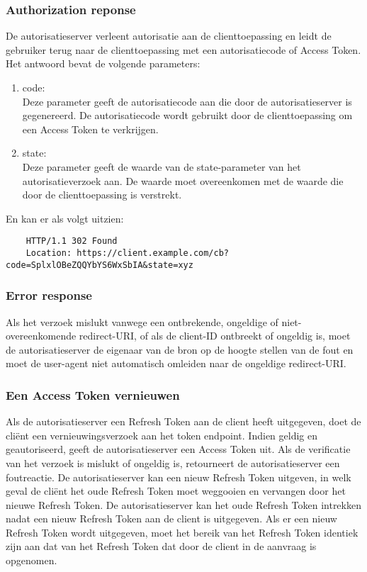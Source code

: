 \subsubsection{Authorization reponse}%
\label{subsubsec:authorization-reponse}
De autorisatieserver verleent autorisatie aan de clienttoepassing en leidt de gebruiker terug naar de clienttoepassing met een autorisatiecode of Access Token. Het antwoord bevat de volgende parameters:
\begin{enumerate}[label=\textbf{-}]
    \item code: \\
    Deze parameter geeft de autorisatiecode aan die door de autorisatieserver is gegenereerd. De autorisatiecode wordt gebruikt door de clienttoepassing om een Access Token te verkrijgen.
  
    \item state: \\
    Deze parameter geeft de waarde van de state-parameter van het autorisatieverzoek aan. De waarde moet overeenkomen met de waarde die door de clienttoepassing is verstrekt.
  \end{enumerate}
  En kan er als volgt uitzien:
  \begin{verbatim}
    HTTP/1.1 302 Found
    Location: https://client.example.com/cb?code=SplxlOBeZQQYbYS6WxSbIA&state=xyz
  \end{verbatim}

\subsubsection{Error response}%
\label{subsubsec:error-response}
Als het verzoek mislukt vanwege een ontbrekende, ongeldige of niet-overeenkomende redirect-URI, of als de client-ID ontbreekt of ongeldig is, moet de autorisatieserver de eigenaar van de bron op de hoogte stellen van de fout en moet de user-agent niet automatisch omleiden naar de ongeldige redirect-URI.

\subsubsection{Een Access Token vernieuwen}%
\label{subsubsec:een-access-token-vernieuwen}
Als de autorisatieserver een Refresh Token aan de client heeft uitgegeven, doet de cliënt een vernieuwingsverzoek aan het token endpoint.
Indien geldig en geautoriseerd, geeft de autorisatieserver een Access Token uit. Als de verificatie van het verzoek is mislukt of ongeldig is, retourneert de autorisatieserver een foutreactie.
De autorisatieserver kan een nieuw Refresh Token uitgeven, in welk geval de cliënt het oude Refresh Token moet weggooien en vervangen door het nieuwe Refresh Token. De autorisatieserver kan het oude Refresh Token intrekken nadat een nieuw Refresh Token aan de client is uitgegeven. Als er een nieuw Refresh Token wordt uitgegeven, moet het bereik van het Refresh Token identiek zijn aan dat van het Refresh Token dat door de client in de aanvraag is opgenomen.


